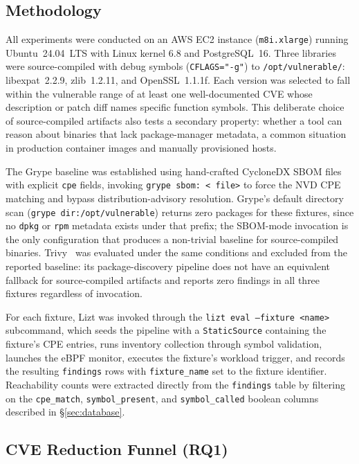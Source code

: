 \documentclass[conference]{IEEEtran}
\begin{document}
\subsection{Methodology}

All experiments were conducted on an AWS EC2 instance (\texttt{m8i.xlarge}) running Ubuntu~24.04~LTS with Linux kernel 6.8 and PostgreSQL~16. Three libraries were source-compiled with debug symbols (\texttt{CFLAGS="-g"}) to \texttt{/opt/vulnerable/}: libexpat~2.2.9, zlib~1.2.11, and OpenSSL~1.1.1f. Each version was selected to fall within the vulnerable range of at least one well-documented CVE whose description or patch diff names specific function symbols. This deliberate choice of source-compiled artifacts also tests a secondary property: whether a tool can reason about binaries that lack package-manager metadata, a common situation in production container images and manually provisioned hosts.

The Grype baseline was established using hand-crafted CycloneDX SBOM files~\cite{cyclonedx} with explicit \texttt{cpe} fields, invoking \texttt{grype sbom: < file>} to force the NVD CPE matching and bypass distribution-advisory resolution. Grype's default directory scan (\texttt{grype dir:/opt/vulnerable}) returns zero packages for these fixtures, since no \texttt{dpkg} or \texttt{rpm} metadata exists under that prefix; the SBOM-mode invocation is the only configuration that produces a non-trivial baseline for source-compiled binaries. Trivy~\cite{trivy} was evaluated under the same conditions and excluded from the reported baseline: its package-discovery pipeline does not have an equivalent fallback for source-compiled artifacts and reports zero findings in all three fixtures regardless of invocation.

For each fixture, Lizt was invoked through the \texttt{lizt eval --fixture <name>} subcommand, which seeds the pipeline with a \texttt{StaticSource} containing the fixture's CPE entries, runs inventory collection through symbol validation, launches the eBPF monitor, executes the fixture's workload trigger, and records the resulting \texttt{findings} rows with \texttt{fixture\_name} set to the fixture identifier. Reachability counts were extracted directly from the \texttt{findings} table by filtering on the \texttt{cpe\_match}, \texttt{symbol\_present}, and \texttt{symbol\_called} boolean columns described in \S\ref{sec:database}.

\subsection{CVE Reduction Funnel (RQ1)}
\end{document}
